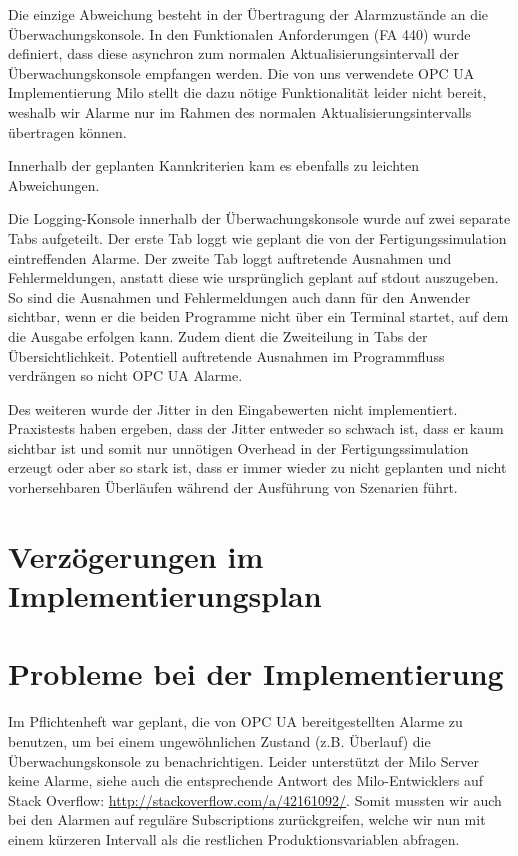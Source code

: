 \documentclass[parskip=full]{scrartcl}
\begin{document}
Die einzige Abweichung besteht in der Übertragung der Alarmzustände an die Überwachungskonsole. In den Funktionalen Anforderungen (FA 440) wurde definiert,
dass diese asynchron zum normalen Aktualisierungsintervall der Überwachungskonsole empfangen werden. Die von uns verwendete OPC UA Implementierung Milo
stellt die dazu nötige Funktionalität leider nicht bereit, weshalb wir Alarme nur im Rahmen des normalen Aktualisierungsintervalls übertragen können.

Innerhalb der geplanten Kannkriterien kam es ebenfalls zu leichten Abweichungen.

Die Logging-Konsole innerhalb der Überwachungskonsole wurde auf zwei separate Tabs aufgeteilt. Der erste Tab loggt wie geplant die von der Fertigungssimulation
eintreffenden Alarme. Der zweite Tab loggt auftretende Ausnahmen und Fehlermeldungen, anstatt diese wie ursprünglich geplant auf stdout auszugeben. So sind die
Ausnahmen und Fehlermeldungen auch dann für den Anwender sichtbar, wenn er die beiden Programme nicht über ein Terminal startet, auf dem die Ausgabe erfolgen kann.
Zudem dient die Zweiteilung in Tabs der Übersichtlichkeit. Potentiell auftretende Ausnahmen im Programmfluss verdrängen so nicht OPC UA Alarme.

Des weiteren wurde der Jitter in den Eingabewerten nicht implementiert. Praxistests haben ergeben, dass der Jitter entweder so schwach ist, dass er kaum sichtbar
ist und somit nur unnötigen Overhead in der Fertigungssimulation erzeugt oder aber so stark ist, dass er immer wieder zu nicht geplanten und nicht vorhersehbaren
Überläufen während der Ausführung von Szenarien führt.

\section{Verzögerungen im Implementierungsplan}


\section{Probleme bei der Implementierung}
Im Pflichtenheft war geplant, die von OPC UA bereitgestellten Alarme zu benutzen, um bei einem ungewöhnlichen Zustand (z.B. Überlauf)
die Überwachungskonsole zu benachrichtigen. Leider unterstützt der Milo Server keine Alarme, siehe auch die entsprechende Antwort
des Milo-Entwicklers auf Stack Overflow: \href{http://stackoverflow.com/a/42161092/}{http://stackoverflow.com/a/42161092/}.
Somit mussten wir auch bei den Alarmen auf reguläre Subscriptions zurückgreifen, welche wir nun mit einem kürzeren Intervall
als die restlichen Produktionsvariablen abfragen.
\end{document}
